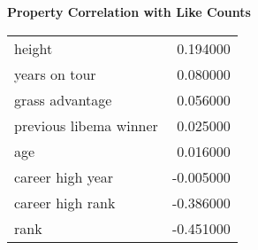 \textbf{Property Correlation with Like Counts}

\begin{tabular}{lr}
\toprule
\midrule
height & 0.194000 \\
years on tour & 0.080000 \\
grass advantage & 0.056000 \\
previous libema winner & 0.025000 \\
age & 0.016000 \\
career high year & -0.005000 \\
career high rank & -0.386000 \\
rank & -0.451000 \\
\bottomrule
\end{tabular}
